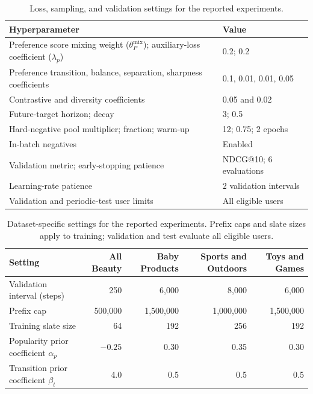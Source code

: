 ﻿\documentclass[sigconf,anonymous,review]{acmart}
\begin{document}
\begin{table}[t]
    \centering
    \small
    \setlength{\tabcolsep}{5pt}
    \renewcommand{\arraystretch}{1.08}
    \begin{tabular}{p{}p{}}
        \toprule
        \textbf{Hyperparameter} & \textbf{Value} \\
        \midrule
        Preference score mixing weight ($\theta_P^{\mathrm{mix}}$); auxiliary-loss coefficient ($\lambda_p$) & 0.2; 0.2 \\
        Preference transition, balance, separation, sharpness coefficients & 0.1, 0.01, 0.01, 0.05 \\
        Contrastive and diversity coefficients & 0.05 and 0.02 \\
        Future-target horizon; decay & 3; 0.5 \\
        Hard-negative pool multiplier; fraction; warm-up & 12; 0.75; 2 epochs \\
        In-batch negatives & Enabled \\
        Validation metric; early-stopping patience & NDCG@10; 6 evaluations \\
        Learning-rate patience & 2 validation intervals \\
        Validation and periodic-test user limits & All eligible users \\
        \bottomrule
    \end{tabular}
    \caption{Loss, sampling, and validation settings for the reported experiments.}
    \label{tab:hyperparameters_training}
\end{table}

\begin{table}[t]
    \centering
    \small
    \setlength{\tabcolsep}{5pt}
    \renewcommand{\arraystretch}{1.08}
    \begin{tabular*}{\textwidth}{@{\extracolsep{\fill}}lrrrr@{}}
        \toprule
        \textbf{Setting} & \textbf{All Beauty} & \textbf{Baby Products} & \textbf{Sports and Outdoors} & \textbf{Toys and Games} \\
        \midrule
        Validation interval (steps) & 250 & 6,000 & 8,000 & 6,000 \\
        Prefix cap & 500,000 & 1,500,000 & 1,000,000 & 1,500,000 \\
        Training slate size & 64 & 192 & 256 & 192 \\
        Popularity prior coefficient $\alpha_p$ & $-0.25$ & 0.30 & 0.35 & 0.30 \\
        Transition prior coefficient $\beta_t$ & 4.0 & 0.5 & 0.5 & 0.5 \\
        \bottomrule
    \end{tabular*}
    \caption{Dataset-specific settings for the reported experiments. Prefix caps and slate sizes apply to training; validation and test evaluate all eligible users.}
    \label{tab:hyperparameters_dataset}
\end{table}
\end{document}
